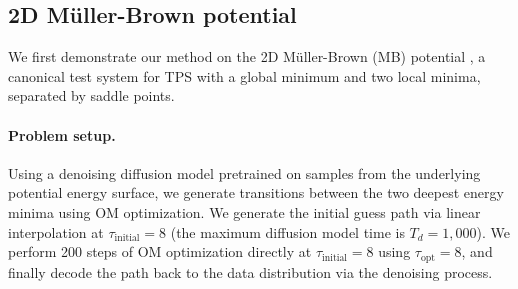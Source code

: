 \subsection{2D Müller-Brown potential}
\label{sec:mb_results} 
\vspace{-5pt}
We first demonstrate our method on the 2D Müller-Brown (MB) potential \cite{muller1979location}, a canonical test system for TPS with a global minimum and two local minima, separated by saddle points.
\vspace{-10pt}
\paragraph{Problem setup.} Using a denoising diffusion model pretrained on samples from the underlying potential energy surface, we generate transitions between the two deepest energy minima using OM optimization. We generate the initial guess path via linear interpolation at $\tau_\text{initial} = 8$ (the maximum diffusion model time is $T_d = 1,000$). We perform 200 steps of OM optimization directly at $\tau_\text{initial} = 8$ using $\tau_\text{opt} = 8$, and finally decode the path back to the data distribution via the denoising process. 
\vspace{-5pt}
